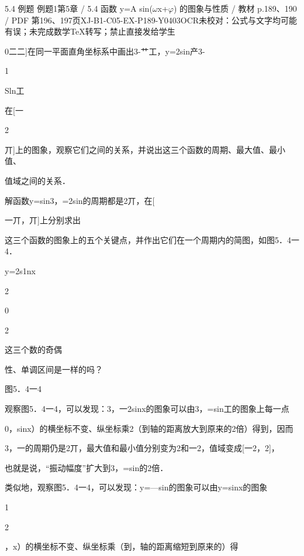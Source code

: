 \begin{bankitem}{5.4 例题 例题1}{第5章 / 5.4 函数 y=A sin(\ensuremath{\omega}x+\ensuremath{\varphi}) 的图象与性质 / 教材 p.189、190 / PDF 第196、197页}{XJ-B1-C05-EX-P189-Y0403}{OCR未校对：公式与文字均可能有误；未完成数学TeX转写；禁止直接发给学生}
\begin{ocrdraft}
\par
0二二]在同一平面直角坐标系中画出3-艹工，y=2sin产3-
\par
1
\par
Sln工
\par
在[一
\par
2
\par
丌]上的图象，观察它们之间的关系，并说出这三个函数的周期、最大值、最小值、
\par
值域之间的关系．
\par
解函数y=sin3，=2sin的周期都是2丌，在[
\par
一丌，丌]上分别求出
\par
这三个函数的图象上的五个关键点，并作出它们在一个周期内的简图，如图5．4一4．
\par
y=2s1nx
\par
2
\par
0
\par
2
\par
这三个数的奇偶
\par
性、单调区间是一样的吗？
\par
图5．4一4
\par
观察图5．4一4，可以发现：3，一2sinx的图象可以由3，=sin工的图象上每一点
\par
0，sinx）的横坐标不变、纵坐标乘2（到轴的距离放大到原来的2倍）得到，因而
\par
3，一的周期仍是2丌，最大值和最小值分别变为2和一2，值域变成[一2，2]，
\par
也就是说，“振动幅度”扩大到3，=sin的2倍．
\par
类似地，观察图5．4一4，可以发现：y=—sin的图象可以由y=sinx的图象
\par
1
\par
2
\par
，x）的横坐标不变、纵坐标乘（到，轴的距离缩短到原来的）得

\end{ocrdraft}
\end{bankitem}
